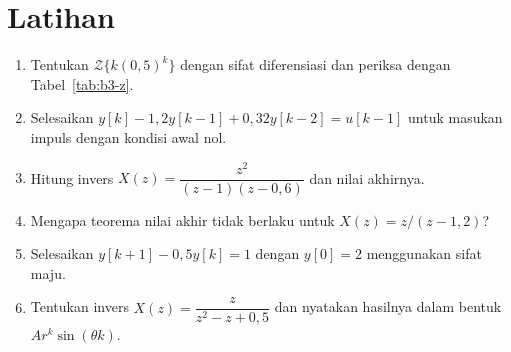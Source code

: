\section*{Latihan}
\begin{enumerate}
	\item Tentukan $\mathcal{Z}\{k(0{,}5)^k\}$ dengan sifat diferensiasi dan periksa dengan Tabel~\ref{tab:b3-z}.
	\item Selesaikan $y[k] - 1{,}2y[k-1] + 0{,}32y[k-2] = u[k-1]$ untuk masukan impuls dengan kondisi awal nol.
	\item Hitung invers $X(z) = \dfrac{z^2}{(z-1)(z-0{,}6)}$ dan nilai akhirnya.
	\item Mengapa teorema nilai akhir tidak berlaku untuk $X(z) = z/(z-1{,}2)$?
	\item Selesaikan $y[k+1] - 0{,}5y[k] = 1$ dengan $y[0] = 2$ menggunakan sifat maju.
	\item Tentukan invers $X(z) = \dfrac{z}{z^2 - z + 0{,}5}$ dan nyatakan hasilnya dalam bentuk $Ar^k\sin(\theta k)$.
\end{enumerate}
